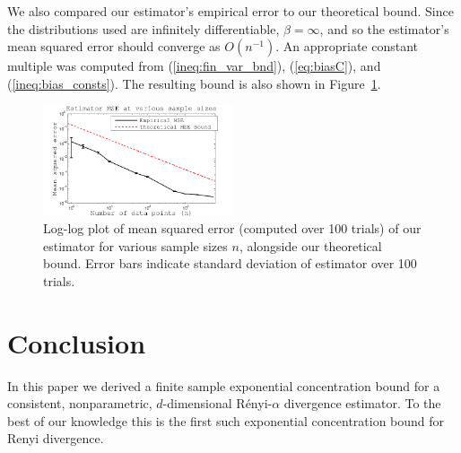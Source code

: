 \documentclass{article}
\newcommand{\inv}{^{-1}}                            %
\begin{document}
We also compared our estimator's empirical error to our theoretical bound.
Since the distributions used are infinitely differentiable, $\beta = \infty$,
and so the estimator's mean squared error should converge as $O(n\inv)$. An
appropriate constant multiple was computed from (\ref{ineq:fin_var_bnd}),
(\ref{eq:biasC}), and (\ref{ineq:bias_consts}). The resulting bound is also
shown in Figure~\ref{fig:MSE}.
\begin{figure}[h!]
\begin{center}
\includegraphics[width=0.5\textwidth]{MSE}
\end{center}
\vspace{-3mm}
\caption{Log-log plot of mean squared error (computed over 100 trials) of our
estimator for various sample sizes $n$, alongside our theoretical bound. Error
bars indicate standard deviation of estimator over 100 trials.}
\label{fig:MSE}
\end{figure}
\vspace{-5mm}
\section{Conclusion} \label{sec:Conclusion}
In this paper we derived a finite sample exponential concentration bound for a
consistent, nonparametric, $d$-dimensional R\'enyi-$\alpha$ divergence
estimator. To the best of our knowledge this is the first such exponential
concentration bound for Renyi divergence.


 


\end{document}
